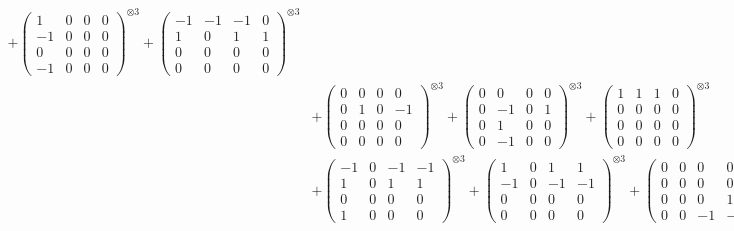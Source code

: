 \documentclass{article}
\begin{document}
{\begin{align}
            + \begin{pmatrix} 1 & 0 & 0 & 0 \\ -1 & 0 & 0 & 0 \\ 0 & 0 & 0 & 0 \\ -1 & 0 & 0 & 0 \end{pmatrix}^{\otimes 3} 
            + \begin{pmatrix} -1 & -1 & -1 & 0 \\ 1 & 0 & 1 & 1 \\ 0 & 0 & 0 & 0 \\ 0 & 0 & 0 & 0 \end{pmatrix}^{\otimes 3} \\
        &+ \label{Rs16-Rc11-Solution-11-c10} \begin{pmatrix} 0 & 0 & 0 & 0 \\ 0 & 1 & 0 & -1 \\ 0 & 0 & 0 & 0 \\ 0 & 0 & 0 & 0 \end{pmatrix}^{\otimes 3} 
            + \begin{pmatrix} 0 & 0 & 0 & 0 \\ 0 & -1 & 0 & 1 \\ 0 & 1 & 0 & 0 \\ 0 & -1 & 0 & 0 \end{pmatrix}^{\otimes 3} 
            + \begin{pmatrix} 1 & 1 & 1 & 0 \\ 0 & 0 & 0 & 0 \\ 0 & 0 & 0 & 0 \\ 0 & 0 & 0 & 0 \end{pmatrix}^{\otimes 3} \\
        &+ \label{Rs16-Rc11-Solution-11-c13} \begin{pmatrix} -1 & 0 & -1 & -1 \\ 1 & 0 & 1 & 1 \\ 0 & 0 & 0 & 0 \\ 1 & 0 & 0 & 0 \end{pmatrix}^{\otimes 3} 
            + \begin{pmatrix} 1 & 0 & 1 & 1 \\ -1 & 0 & -1 & -1 \\ 0 & 0 & 0 & 0 \\ 0 & 0 & 0 & 0 \end{pmatrix}^{\otimes 3} 
            + \begin{pmatrix} 0 & 0 & 0 & 0 \\ 0 & 0 & 0 & 0 \\ 0 & 0 & 0 & 1 \\ 0 & 0 & -1 & -1 \end{pmatrix}^{\otimes 3} \\

\end{align}}
\end{document}
